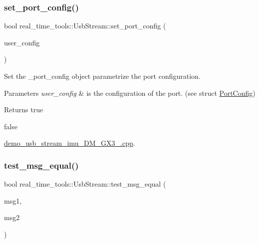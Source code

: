 \subsubsection{\texorpdfstring{set\+\_\+port\+\_\+config()}{set\_port\_config()}}
{\footnotesize\ttfamily bool real\+\_\+time\+\_\+tools\+::\+Usb\+Stream\+::set\+\_\+port\+\_\+config (\begin{DoxyParamCaption}\item[{const \hyperlink{classreal__time__tools_1_1PortConfig}{Port\+Config} \&}]{user\+\_\+config }\end{DoxyParamCaption})}



Set the \+\_\+port\+\_\+config object parametrize the port configuration. 


\begin{DoxyParams}{Parameters}
{\em user\+\_\+config} & is the configuration of the port. (see struct \hyperlink{classreal__time__tools_1_1PortConfig}{Port\+Config}) \\
\hline
\end{DoxyParams}
\begin{DoxyReturn}{Returns}
true 

false 
\end{DoxyReturn}
\begin{Desc}
\item[Examples\+: ]\par
\hyperlink{demo_usb_stream_imu_3DM_GX3_25_8cpp-example}{demo\+\_\+usb\+\_\+stream\+\_\+imu\+\_\+D\+M\+\_\+\+G\+X3\+\_.\+cpp}.\end{Desc}
\mbox{\label{classreal__time__tools_1_1UsbStream_ae3e565f6ea54fb5c4666b98745e9f87f}} 
\subsubsection{\texorpdfstring{test\+\_\+msg\+\_\+equal()}{test\_msg\_equal()}}
{\footnotesize\ttfamily bool real\+\_\+time\+\_\+tools\+::\+Usb\+Stream\+::test\+\_\+msg\+\_\+equal (\begin{DoxyParamCaption}\item[{const std\+::vector$<$ uint8\+\_\+t $>$ \&}]{msg1,  }\item[{const std\+::vector$<$ uint8\+\_\+t $>$ \&}]{msg2 }\end{DoxyParamCaption})\hspace{0.3cm}{\ttfamily [static]}}



